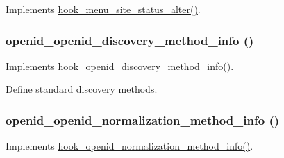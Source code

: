 \label{openid_8module_aff513e1dfb782931acb6ba216acf47d6}
Implements \hyperlink{group__hooks_ga3096be11aad61c8b342ade94789f6137}{hook\_\-menu\_\-site\_\-status\_\-alter()}. \hypertarget{openid_8module_adf3edad18f0e31d9dc5c2ed6429f1983}{
\subsubsection[{openid\_\-openid\_\-discovery\_\-method\_\-info}]{\setlength{\rightskip}{0pt plus 5cm}openid\_\-openid\_\-discovery\_\-method\_\-info ()}}
\label{openid_8module_adf3edad18f0e31d9dc5c2ed6429f1983}
Implements \hyperlink{group__hooks_gaec6cbfdd913d8ba670c991b87bbf9676}{hook\_\-openid\_\-discovery\_\-method\_\-info()}.

Define standard discovery methods. \hypertarget{openid_8module_a24787fe76c0379844feb68970ee993fb}{
\subsubsection[{openid\_\-openid\_\-normalization\_\-method\_\-info}]{\setlength{\rightskip}{0pt plus 5cm}openid\_\-openid\_\-normalization\_\-method\_\-info ()}}
\label{openid_8module_a24787fe76c0379844feb68970ee993fb}
Implements \hyperlink{group__hooks_ga53b4878d46aae5aea7de146ab543c585}{hook\_\-openid\_\-normalization\_\-method\_\-info()}.

